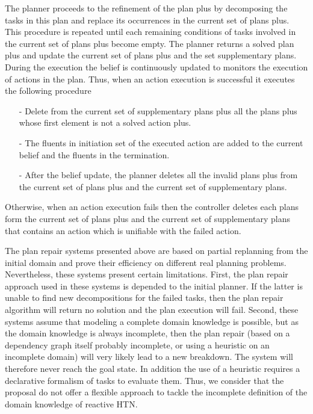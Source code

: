 The planner proceeds to the refinement of the plan plus by decomposing the tasks in this plan and replace its occurrences in the current set of plans plus. This procedure is repeated until each remaining conditions of tasks involved in the current set of plans plus become empty.  The planner returns a solved plan plus and update the current set of plans plus and the set supplementary plans.
During the execution the belief is continuously updated to monitors the execution of actions in the plan. 
Thus, when an action execution is successful it executes the following procedure 
\begin{itemize}
\item[-]	Delete from the current set of supplementary plans plus all the plans plus whose first element is not a solved action plus.
\item[-]	The fluents in initiation set of the executed action are added to the current belief and the fluents in the termination. 
\item[-]	After the belief update, the planner deletes all the invalid plans plus from the current set of plans plus and the current set of supplementary plans.
\end{itemize}
Otherwise, when an action execution fails then the controller deletes each plans form the current set of plans plus and the current set of supplementary plans that contains an action which is unifiable with the failed action.  


The plan repair systems presented above are based on partial replanning from the initial domain and prove their efficiency on different real planning problems. Nevertheless, these systems present certain limitations.
First,  the plan repair approach used in these systems  is depended to the initial planner. If the latter is unable to find new decompositions for the failed tasks, then the  plan repair algorithm will return no solution and the plan execution will fail.
 Second, these systems assume that modeling a complete domain knowledge is possible, but as the domain knowledge is always incomplete, then the plan repair (based on a dependency graph itself probably incomplete, or using a heuristic on an incomplete domain) will very likely lead to a new breakdown. The system will therefore never reach the goal state. In addition the use of a heuristic requires a declarative formalism of tasks to evaluate them. Thus, we consider that  the proposal  do not offer a flexible approach to tackle the incomplete definition of the domain knowledge of reactive HTN.  





 
